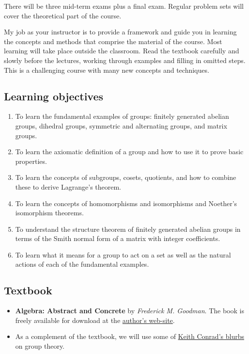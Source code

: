 \documentclass[11pt]{article}
\begin{document}
There will be three mid-term exams plus a final exam. Regular problem sets will
cover the theoretical part of the course.

My job as your instructor is to provide a framework and guide you in learning
the concepts and methods that comprise the material of the course. Most
learning will take place outside the classroom. Read the textbook carefully and
slowly before the lectures, working through examples and filling in omitted
steps. This is a challenging course with many new concepts and techniques.

\subsection{Learning objectives}
\label{sec:org93c80d8}

\begin{enumerate}
\item To learn the fundamental examples of groups: finitely generated abelian
groups, dihedral groups, symmetric and alternating groups, and matrix
groups.
\item To learn the axiomatic definition of a group and how to use it to prove
basic properties.
\item To learn the concepts of subgroups, cosets, quotients, and how to combine
these to derive Lagrange’s theorem.
\item To learn the concepts of homomorphisms and isomorphisms and Noether's
isomorphism theorems.
\item To understand the structure theorem of finitely generated abelian groups in
terms of the Smith normal form of a matrix with integer coefficients.
\item To learn what it means for a group to act on a set as well as the
natural actions of each of the fundamental examples.
\end{enumerate}

\subsection{Textbook}
\label{sec:orgbe4926d}
\begin{itemize}
\item \textbf{Algebra: Abstract and Concrete} by \emph{Frederick M. Goodman}. The book is
freely available for download at the \href{https://homepage.divms.uiowa.edu/\~goodman/algebrabook.dir/algebrabook.html}{author's web-site}.
\item As a complement of the textbook, we will use some of \href{https://kconrad.math.uconn.edu/blurbs/}{Keith Conrad's blurbs} on
group theory.
\end{itemize}
\end{document}
